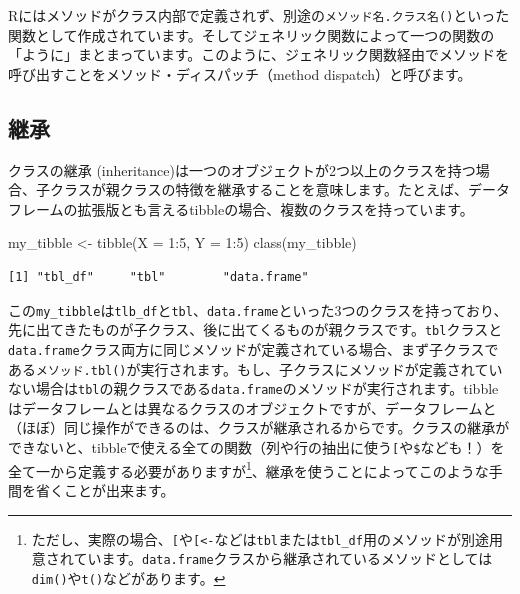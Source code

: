 \documentclass[
  a4paper,
  pandoc,
  ja=standard,
  jafont=haranoaji]{bxjsbook}
\newenvironment{Shaded}{\begin{snugshade}}{\end{snugshade}}
\newcommand{\AttributeTok}[1]{\textcolor[rgb]{0.00,0.48,0.65}{#1}}
\newcommand{\DecValTok}[1]{\textcolor[rgb]{0.68,0.00,0.00}{#1}}
\newcommand{\FunctionTok}[1]{\textcolor[rgb]{0.28,0.35,0.67}{#1}}
\newcommand{\NormalTok}[1]{\textcolor[rgb]{0.00,0.48,0.65}{#1}}
\newcommand{\OtherTok}[1]{\textcolor[rgb]{0.00,0.48,0.65}{#1}}
\newcommand{\SpecialCharTok}[1]{\textcolor[rgb]{0.37,0.37,0.37}{#1}}
\begin{document}
Rにはメソッドがクラス内部で定義されず、別途の\texttt{メソッド名.クラス名()}といった関数として作成されています。そしてジェネリック関数によって一つの関数の「ように」まとまっています。このように、ジェネリック関数経由でメソッドを呼び出すことをメソッド・ディスパッチ（method
dispatch）と呼びます。

\hypertarget{ux7d99ux627f}{%
\subsection{継承}\label{ux7d99ux627f}}

クラスの継承
(inheritance)は一つのオブジェクトが2つ以上のクラスを持つ場合、子クラスが親クラスの特徴を継承することを意味します。たとえば、データフレームの拡張版とも言えるtibbleの場合、複数のクラスを持っています。

\begin{Shaded}
\begin{Highlighting}[numbers=left,,]
\NormalTok{my\_tibble }\OtherTok{\textless{}{-}} \FunctionTok{tibble}\NormalTok{(}\AttributeTok{X =} \DecValTok{1}\SpecialCharTok{:}\DecValTok{5}\NormalTok{, }\AttributeTok{Y =} \DecValTok{1}\SpecialCharTok{:}\DecValTok{5}\NormalTok{)}
\FunctionTok{class}\NormalTok{(my\_tibble)}
\end{Highlighting}
\end{Shaded}

\begin{verbatim}
[1] "tbl_df"     "tbl"        "data.frame"
\end{verbatim}

この\texttt{my\_tibble}は\texttt{tlb\_df}と\texttt{tbl}、\texttt{data.frame}といった3つのクラスを持っており、先に出てきたものが子クラス、後に出てくるものが親クラスです。\texttt{tbl}クラスと\texttt{data.frame}クラス両方に同じメソッドが定義されている場合、まず子クラスである\texttt{メソッド.tbl()}が実行されます。もし、子クラスにメソッドが定義されていない場合は\texttt{tbl}の親クラスである\texttt{data.frame}のメソッドが実行されます。tibbleはデータフレームとは異なるクラスのオブジェクトですが、データフレームと（ほぼ）同じ操作ができるのは、クラスが継承されるからです。クラスの継承ができないと、tibbleで使える全ての関数（列や行の抽出に使う\texttt{{[}}や\texttt{\$}なども！）を全て一から定義する必要がありますが\footnote{ただし、実際の場合、\texttt{{[}}や\texttt{{[}\textless{}-}などは\texttt{tbl}または\texttt{tbl\_df}用のメソッドが別途用意されています。\texttt{data.frame}クラスから継承されているメソッドとしては\texttt{dim()}や\texttt{t()}などがあります。}、継承を使うことによってこのような手間を省くことが出来ます。
\end{document}
